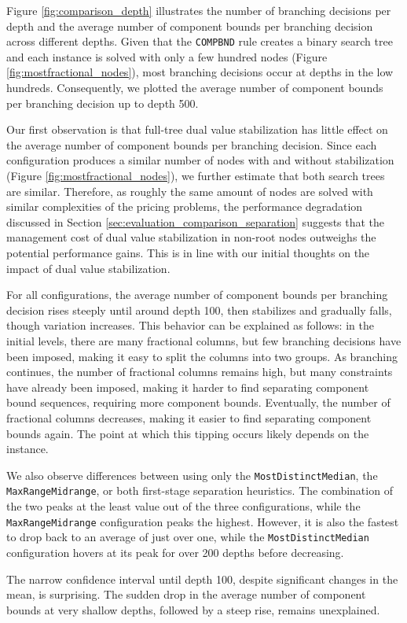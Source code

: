 Figure \ref{fig:comparison_depth} illustrates the number of branching decisions per depth and the average number of component bounds per branching decision across different depths. Given that the \texttt{COMPBND} rule creates a binary search tree and each instance is solved with only a few hundred nodes (Figure \ref{fig:mostfractional_nodes}), most branching decisions occur at depths in the low hundreds. Consequently, we plotted the average number of component bounds per branching decision up to depth 500.

Our first observation is that full-tree dual value stabilization has little effect on the average number of component bounds per branching decision. Since each configuration produces a similar number of nodes with and without stabilization (Figure \ref{fig:mostfractional_nodes}), we further estimate that both search trees are similar. Therefore, as roughly the same amount of nodes are solved with similar complexities of the pricing problems, the performance degradation discussed in Section \ref{sec:evaluation_comparison_separation} suggests that the management cost of dual value stabilization in non-root nodes outweighs the potential performance gains. This is in line with our initial thoughts on the impact of dual value stabilization.

For all configurations, the average number of component bounds per branching decision rises steeply until around depth 100, then stabilizes and gradually falls, though variation increases. This behavior can be explained as follows: in the initial levels, there are many fractional columns, but few branching decisions have been imposed, making it easy to split the columns into two groups. As branching continues, the number of fractional columns remains high, but many constraints have already been imposed, making it harder to find separating component bound sequences, requiring more component bounds. Eventually, the number of fractional columns decreases, making it easier to find separating component bounds again. The point at which this tipping occurs likely depends on the instance.

We also observe differences between using only the \texttt{MostDistinctMedian}, the \texttt{MaxRangeMidrange}, or both first-stage separation heuristics. The combination of the two peaks at the least value out of the three configurations, while the \texttt{MaxRangeMidrange} configuration peaks the highest. However, it is also the fastest to drop back to an average of just over one, while the \texttt{MostDistinctMedian} configuration hovers at its peak for over 200 depths before decreasing.

The narrow confidence interval until depth 100, despite significant changes in the mean, is surprising. The sudden drop in the average number of component bounds at very shallow depths, followed by a steep rise, remains unexplained.
